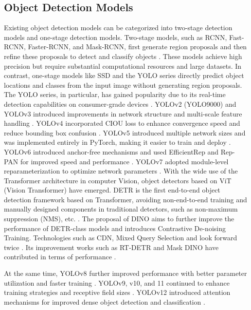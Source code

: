 \documentclass{article}
\begin{document}
\subsection{Object Detection Models}
Existing object detection models can be categorized into 
two-stage detection models and one-stage detection models.  
Two-stage models, such as RCNN, Fast-RCNN, Faster-RCNN,  
and Mask-RCNN, first generate region proposals and then  
refine these proposals to detect and classify objects \cite{girshick2014rich,girshick2015fast,ren2016faster,he2017mask}.  
These models achieve high precision but require substantial  
computational resources and large datasets.  
In contrast, one-stage models like SSD and the YOLO series  
directly predict object locations and classes from the  
input image without generating region proposals.  
The YOLO series, in particular, has gained popularity due to  
its real-time detection capabilities on consumer-grade devices \cite{liu2016ssd,redmon2016you}.  
YOLOv2 (YOLO9000) and YOLOv3 introduced improvements in network  
structure and multi-scale feature handling \cite{redmon2017yolo9000,redmon2018yolov3}.  
YOLOv4 incorporated CIOU loss to enhance convergence speed  
and reduce bounding box confusion \cite{bochkovskiy2020yolov4}.  
YOLOv5 introduced multiple network sizes and was implemented  
entirely in PyTorch, making it easier to train and deploy \cite{jocher2020ultralytics}.  
YOLOv6 introduced anchor-free mechanisms and used EfficientRep  
and Rep-PAN for improved speed and performance \cite{li2022yolov6}.  
YOLOv7 adopted module-level reparameterization to optimize  
network parameters \cite{wang2023yolov7}.  
With the wide use of the Transformer architecture in computer Vision, object detectors based on 
ViT (Vision Transformer) have emerged. DETR is the first end-to-end object detection framework based 
on Transformer, avoiding non-end-to-end training and manually designed components in traditional detectors, 
such as non-maximum suppression (NMS), etc. \cite{carion2020end}. The proposal of DINO aims to further improve the performance 
of DETR-class models and introduces Contrastive De-noising Training. Technologies such as CDN, Mixed Query 
Selection and look forward twice \cite{zhang2022dino}. 
Its improvement works such as RT-DETR and Mask DINO have contributed in terms of performance \cite{li2023mask,zhao2024detrs,lv2024rt}.

At the same time, YOLOv8 further improved performance with better parameter  
utilization and faster training \cite{sohan2024review}.  
YOLOv9, v10, and 11 continued to enhance training strategies  
and receptive field sizes \cite{wang2024yolov9,wang2024yolov10,khanam2024yolov11}.  
YOLOv12 introduced attention mechanisms for improved dense  
object detection and classification \cite{tian2025yolov12}.  
\end{document}
